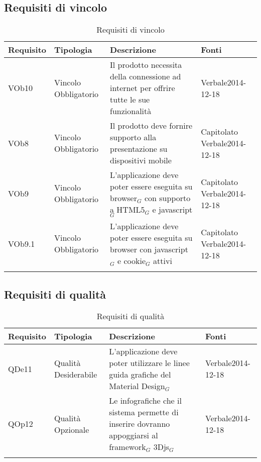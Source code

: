 \newpage
\subsection{ Requisiti di vincolo}
	
\begin{longtable}{|l|p{2.5cm}|p{5cm}|p{3.5cm}|}
\hline
\textbf{Requisito} & \textbf{Tipologia} & \textbf{Descrizione} & \textbf{Fonti} \\
\hline
VOb10 & Vincolo \linebreak Obbligatorio & Il prodotto necessita della connessione ad internet per offrire tutte le sue funzionalità & Verbale2014-12-18 \linebreak \\
\hline
VOb8 & Vincolo \linebreak Obbligatorio & Il prodotto deve fornire supporto alla presentazione su dispositivi mobile & Capitolato \linebreak Verbale2014-12-18 \linebreak \\
\hline
VOb9 & Vincolo \linebreak Obbligatorio & L'applicazione deve poter essere eseguita su browser$_G$ con supporto a HTML5$_G$ e javascript$_G$ & Capitolato \linebreak Verbale2014-12-18 \linebreak \\
\hline
VOb9.1 & Vincolo \linebreak Obbligatorio & L'applicazione deve poter essere eseguita su browser con javascript$_G$ e cookie$_G$ attivi & Capitolato \linebreak  Verbale2014-12-18 \linebreak  \\
\hline
\caption{Requisiti di vincolo}
\end{longtable}

\newpage
\subsection{ Requisiti di qualità}
\begin{longtable}{|l|p{2.5cm}|p{5cm}|p{3.5cm}|}
\hline
\textbf{Requisito} & \textbf{Tipologia} & \textbf{Descrizione} & \textbf{Fonti} \\
\hline
QDe11 & Qualità \linebreak Desiderabile & L'applicazione deve poter utilizzare le linee guida grafiche del Material Design$_G$ & Verbale2014-12-18 \\
\hline
QOp12 & Qualità \linebreak Opzionale & Le infografiche che il sistema permette di inserire dovranno appoggiarsi al framework$_G$ 3Djs$_G$ & Verbale2014-12-18 \\
\hline
\caption{Requisiti di qualità}
\end{longtable}

